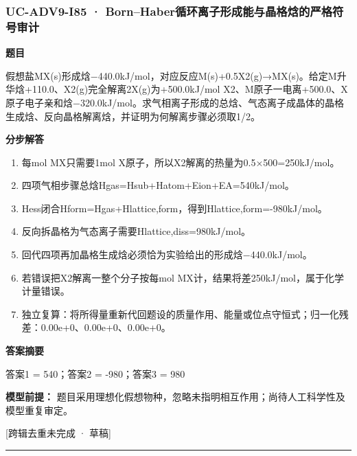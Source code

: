 \documentclass[UTF8,11pt,a4paper]{ctexart}
\begin{document}
\subsubsection*{UC-ADV9-I85 · Born–Haber循环离子形成能与晶格焓的严格符号审计}
\noindent\textbf{题目}\par
假想盐MX(s)形成焓−440.0kJ/mol，对应反应M(s)+0.5X2(g)→MX(s)。给定M升华焓+110.0、X2(g)完全解离2X(g)为+500.0kJ/mol X2、M原子一电离+500.0、X原子电子亲和焓−320.0kJ/mol。求气相离子形成的总焓、气态离子成晶体的晶格生成焓、反向晶格解离焓，并证明为何解离步骤必须取1/2。\par
\medskip\noindent\textbf{分步解答}
\begin{enumerate}
\item 每mol MX只需要1mol X原子，所以X2解离的热量为0.5×500=250kJ/mol。
\item 四项气相步骤总焓Hgas=Hsub+Hatom+Eion+EA=540kJ/mol。
\item Hess闭合Hform=Hgas+Hlattice,form，得到Hlattice,form=-980kJ/mol。
\item 反向拆晶格为气态离子需要Hlattice,diss=980kJ/mol。
\item 回代四项再加晶格生成焓必须恰为实验给出的形成焓−440.0kJ/mol。
\item 若错误把X2解离一整个分子按每mol MX计，结果将差250kJ/mol，属于化学计量错误。
\item 独立复算：将所得量重新代回题设的质量作用、能量或位点守恒式；归一化残差：0.00e+0、0.00e+0、0.00e+0。
\end{enumerate}
\noindent\textbf{答案摘要}\par
答案1 = 540；答案2 = -980；答案3 = 980\par
\noindent\textbf{模型前提：}
题目采用理想化假想物种，忽略未指明相互作用；尚待人工科学性及模型重复审定。\par
\noindent\textcolor{red!65!black}{[跨辑去重未完成 · 草稿]} \par
\medskip\hrule\medskip
{}
\end{document}
